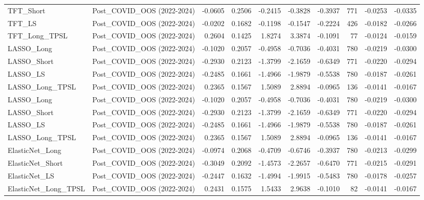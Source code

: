 \begin{tabular}{llrrrrrrrr}
\cline{1-10}
TFT\_Short & Post\_COVID\_OOS (2022-2024) & -0.0605 & 0.2506 & -0.2415 & -0.3828 & -0.3937 & 771 & -0.0253 & -0.0335 \\
\cline{1-10}
TFT\_LS & Post\_COVID\_OOS (2022-2024) & -0.0202 & 0.1682 & -0.1198 & -0.1547 & -0.2224 & 426 & -0.0182 & -0.0266 \\
\cline{1-10}
TFT\_Long\_TPSL & Post\_COVID\_OOS (2022-2024) & 0.2604 & 0.1425 & 1.8274 & 3.3874 & -0.1091 & 77 & -0.0124 & -0.0159 \\
\cline{1-10}
LASSO\_Long & Post\_COVID\_OOS (2022-2024) & -0.1020 & 0.2057 & -0.4958 & -0.7036 & -0.4031 & 780 & -0.0219 & -0.0300 \\
\cline{1-10}
LASSO\_Short & Post\_COVID\_OOS (2022-2024) & -0.2930 & 0.2123 & -1.3799 & -2.1659 & -0.6349 & 771 & -0.0220 & -0.0294 \\
\cline{1-10}
LASSO\_LS & Post\_COVID\_OOS (2022-2024) & -0.2485 & 0.1661 & -1.4966 & -1.9879 & -0.5538 & 780 & -0.0187 & -0.0261 \\
\cline{1-10}
LASSO\_Long\_TPSL & Post\_COVID\_OOS (2022-2024) & 0.2365 & 0.1567 & 1.5089 & 2.8894 & -0.0965 & 136 & -0.0141 & -0.0167 \\
\cline{1-10}
LASSO\_Long & Post\_COVID\_OOS (2022-2024) & -0.1020 & 0.2057 & -0.4958 & -0.7036 & -0.4031 & 780 & -0.0219 & -0.0300 \\
\cline{1-10}
LASSO\_Short & Post\_COVID\_OOS (2022-2024) & -0.2930 & 0.2123 & -1.3799 & -2.1659 & -0.6349 & 771 & -0.0220 & -0.0294 \\
\cline{1-10}
LASSO\_LS & Post\_COVID\_OOS (2022-2024) & -0.2485 & 0.1661 & -1.4966 & -1.9879 & -0.5538 & 780 & -0.0187 & -0.0261 \\
\cline{1-10}
LASSO\_Long\_TPSL & Post\_COVID\_OOS (2022-2024) & 0.2365 & 0.1567 & 1.5089 & 2.8894 & -0.0965 & 136 & -0.0141 & -0.0167 \\
\cline{1-10}
ElasticNet\_Long & Post\_COVID\_OOS (2022-2024) & -0.0974 & 0.2068 & -0.4709 & -0.6746 & -0.3937 & 780 & -0.0213 & -0.0299 \\
\cline{1-10}
ElasticNet\_Short & Post\_COVID\_OOS (2022-2024) & -0.3049 & 0.2092 & -1.4573 & -2.2657 & -0.6470 & 771 & -0.0215 & -0.0291 \\
\cline{1-10}
ElasticNet\_LS & Post\_COVID\_OOS (2022-2024) & -0.2447 & 0.1632 & -1.4994 & -1.9915 & -0.5483 & 780 & -0.0178 & -0.0257 \\
\cline{1-10}
ElasticNet\_Long\_TPSL & Post\_COVID\_OOS (2022-2024) & 0.2431 & 0.1575 & 1.5433 & 2.9638 & -0.1010 & 82 & -0.0141 & -0.0167 \\

\end{tabular}

